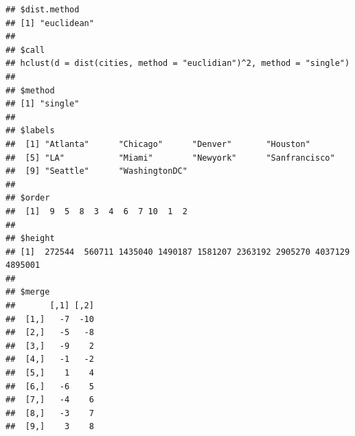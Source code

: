 \documentclass[]{article}
\begin{document}
\begin{verbatim}
## $dist.method
## [1] "euclidean"
## 
## $call
## hclust(d = dist(cities, method = "euclidian")^2, method = "single")
## 
## $method
## [1] "single"
## 
## $labels
##  [1] "Atlanta"      "Chicago"      "Denver"       "Houston"     
##  [5] "LA"           "Miami"        "Newyork"      "Sanfrancisco"
##  [9] "Seattle"      "WashingtonDC"
## 
## $order
##  [1]  9  5  8  3  4  6  7 10  1  2
## 
## $height
## [1]  272544  560711 1435040 1490187 1581207 2363192 2905270 4037129 4895001
## 
## $merge
##       [,1] [,2]
##  [1,]   -7  -10
##  [2,]   -5   -8
##  [3,]   -9    2
##  [4,]   -1   -2
##  [5,]    1    4
##  [6,]   -6    5
##  [7,]   -4    6
##  [8,]   -3    7
##  [9,]    3    8
\end{verbatim}
\end{document}
